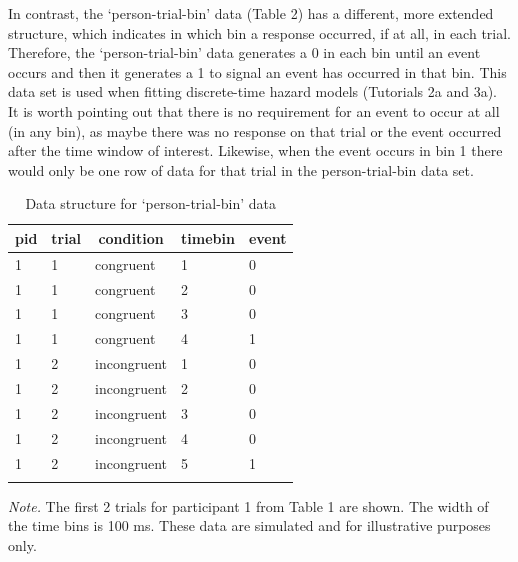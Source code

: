 \documentclass[
  man, donotrepeattitle,floatsintext]{apa6}
\begin{document}
In contrast, the `person-trial-bin' data (Table 2) has a different, more extended structure, which indicates in which bin a response occurred, if at all, in each trial. Therefore, the `person-trial-bin' data generates a 0 in each bin until an event occurs and then it generates a 1 to signal an event has occurred in that bin. This data set is used when fitting discrete-time hazard models (Tutorials 2a and 3a). It is worth pointing out that there is no requirement for an event to occur at all (in any bin), as maybe there was no response on that trial or the event occurred after the time window of interest. Likewise, when the event occurs in bin 1 there would only be one row of data for that trial in the person-trial-bin data set.





\begin{table}[H]

\begin{center}
\begin{threeparttable}

\caption{\label{tab:ha-data-table}Data structure for `person-trial-bin' data}

\begin{tabular}{lllll}
\toprule
pid & \multicolumn{1}{c}{trial} & \multicolumn{1}{c}{condition} & \multicolumn{1}{c}{timebin} & \multicolumn{1}{c}{event}\\
\midrule
1 & 1 & congruent & 1 & 0\\
1 & 1 & congruent & 2 & 0\\
1 & 1 & congruent & 3 & 0\\
1 & 1 & congruent & 4 & 1\\
1 & 2 & incongruent & 1 & 0\\
1 & 2 & incongruent & 2 & 0\\
1 & 2 & incongruent & 3 & 0\\
1 & 2 & incongruent & 4 & 0\\
1 & 2 & incongruent & 5 & 1\\
\bottomrule
\addlinespace
\end{tabular}

\begin{tablenotes}[para]
\normalsize{\textit{Note.} The first 2 trials for participant 1 from Table 1 are shown. The width of the time bins is 100 ms. These data are simulated and for illustrative purposes only.}
\end{tablenotes}

\end{threeparttable}
\end{center}

\end{table}
\end{document}
